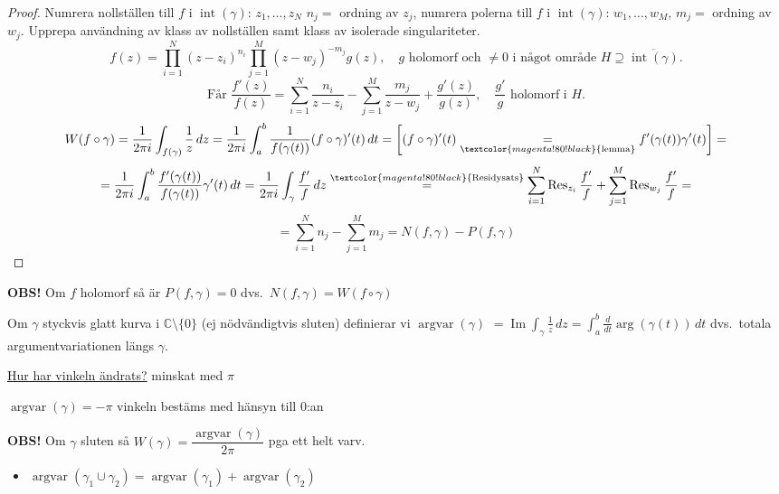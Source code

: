 \begin{proof}
Numrera nollställen till $f$ i $\operatorname{int}(\gamma)$: $z_1, \dots, z_N$ \quad $n_j = $ ordning av $z_j$, numrera polerna till $f$ i $\operatorname{int}(\gamma)$: $w_1, \dots, w_M$, $m_j = $ ordning av $w_j$. Upprepa användning av klass av nollställen samt klass av isolerade singulariteter.
\[ f(z) = \prod_{i = 1}^N (z - z_i)^{n_i} \prod_{j = 1}^M (z - w_j)^{-m_j} g(z), \quad g \text{ holomorf och } \neq 0 \text{ i något område } H \supseteq \overline{\operatorname{int}(\gamma)}. \]
\[ \text{Får } \frac{f'(z)}{f(z)} = \sum_{i = 1}^N \frac{n_i}{z - z_i} - \sum_{j = 1}^M \frac{m_j}{z - w_j} + \frac{g'(z)}{g(z)}, \quad \frac{g'}{g} \text{ holomorf i } H. \]
\[ W(f \circ \gamma) = \frac{1}{2\pi i} \int_{f(\gamma)} \frac{1}{z}\,dz = \frac{1}{2\pi i} \int_a^b \frac{1}{f(\gamma(t))} (f \circ \gamma)'(t)\,dt = \left[ (f \circ \gamma)'(t) \underset{\textcolor{magenta!80!black}{\text{lemma}}}{=} f'(\gamma(t))\gamma'(t) \right] = \]
\[ = \frac{1}{2\pi i} \int_a^b \frac{f'(\gamma(t))}{f(\gamma(t))} \gamma'(t)\,dt = \frac{1}{2\pi i} \int_\gamma \frac{f'}{f}\,dz \overset{\textcolor{magenta!80!black}{\text{Residysats}}}{=} \sum_{i = 1}^N \operatorname{Res}_{z_i} \frac{f'}{f} + \sum_{j = 1}^M \operatorname{Res}_{w_j} \frac{f'}{f} = \]
\[ = \sum_{i = 1}^N n_j - \sum_{j = 1}^M m_j = N(f, \gamma) - P(f, \gamma) \]
\end{proof}

\textcolor{red!70!black}{\textbf{OBS!}} Om $f$ holomorf så är $P(f, \gamma) = 0$ dvs.\ $N(f, \gamma) = W(f \circ \gamma)$

\begin{definition}
Om $\gamma$ styckvis glatt kurva i $\mathbb{C} \setminus \{0\}$ (ej nödvändigtvis sluten) definierar vi \emph{$\operatorname{argvar}(\gamma)$} $= \operatorname{Im} \displaystyle\int_\gamma \frac{1}{z}\,dz = \int_a^b \frac{d}{dt} \arg(\gamma(t))\,dt$ dvs.\ totala argumentvariationen längs $\gamma$.
\end{definition}

\begin{example}
\underline{Hur har vinkeln ändrats?} minskat med $\pi$

$\operatorname{argvar}(\gamma) = -\pi$ \quad \textcolor{magenta!80!black}{vinkeln bestäms med hänsyn till 0:an}
\end{example}

\textcolor{red!70!black}{\textbf{OBS!}} Om $\gamma$ sluten så $W(\gamma) = \dfrac{\operatorname{argvar}(\gamma)}{2\pi}$ \quad \textcolor{magenta!80!black}{pga ett helt varv.}
\begin{itemize}
  \item $\operatorname{argvar}(\gamma_1 \cup \gamma_2) = \operatorname{argvar}(\gamma_1) + \operatorname{argvar}(\gamma_2)$
\end{itemize}


